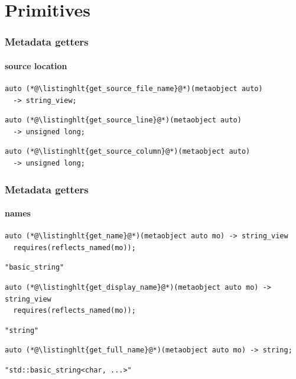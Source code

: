 \documentclass[aspectratio=169,compress,table,xcolor=table]{beamer}
\begin{document}
\section{Primitives}
\begin{frame}[fragile]
  \frametitle{Metadata getters}
  \framesubtitle{source location}
  \begin{lstlisting}[language=c++2x,basicstyle=\large\ttfamily]
auto (*@\listinghlt{get_source_file_name}@*)(metaobject auto)
  -> string_view;
  \end{lstlisting}
  \vfill
  \begin{lstlisting}[language=c++2x,basicstyle=\large\ttfamily]
auto (*@\listinghlt{get_source_line}@*)(metaobject auto)
  -> unsigned long;
  \end{lstlisting}
  \vfill
  \begin{lstlisting}[language=c++2x,basicstyle=\large\ttfamily]
auto (*@\listinghlt{get_source_column}@*)(metaobject auto)
  -> unsigned long;
  \end{lstlisting}
\end{frame}
\begin{frame}[fragile]
  \frametitle{Metadata getters}
  \framesubtitle{names}
  \begin{lstlisting}[language=c++2x]
auto (*@\listinghlt{get_name}@*)(metaobject auto mo) -> string_view
  requires(reflects_named(mo));
  \end{lstlisting}
  \begin{verbatim}
"basic_string"
  \end{verbatim}
  \vfill
  \begin{lstlisting}[language=c++2x]
auto (*@\listinghlt{get_display_name}@*)(metaobject auto mo) -> string_view
  requires(reflects_named(mo));
  \end{lstlisting}
  \begin{verbatim}
"string"
  \end{verbatim}
  \vfill
  \begin{lstlisting}[language=c++2x]
auto (*@\listinghlt{get_full_name}@*)(metaobject auto mo) -> string;
  \end{lstlisting}
  \begin{verbatim}
"std::basic_string<char, ...>"
  \end{verbatim}
\end{frame}
\end{document}
